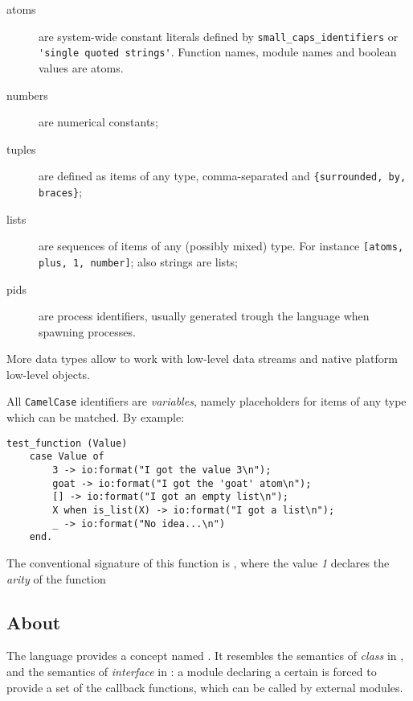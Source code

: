 \begin{description}

    \item[atoms] are system-wide constant literals defined by
        \lstinline{small_caps_identifiers} or
        \lstinline{'single quoted strings'}. Function names, module
        names and boolean values are atoms.

    \item[numbers] are numerical constants;

    \item[tuples] are defined as items of any type, comma-separated and
        \lstinline|{surrounded, by, braces}|;

    \item[lists] are sequences of items of any (possibly mixed) type.
        For instance
        \lstinline{[atoms, plus, 1, number]}; also strings are lists;

    \item[pids] are process identifiers, usually generated trough the
        language  when spawning processes.

\end{description}

More data types allow to work with low-level data streams and native
platform low-level objects.

All \lstinline{CamelCase} identifiers are \emph{variables}, namely
placeholders for items of any type which can be matched. By example:

\begin{lstlisting}
test_function (Value)
    case Value of
        3 -> io:format("I got the value 3\n");
        goat -> io:format("I got the 'goat' atom\n");
        [] -> io:format("I got an empty list\n");
        X when is_list(X) -> io:format("I got a list\n");
        _ -> io:format("No idea...\n")
    end.
\end{lstlisting}

The conventional signature of this function is ,
where the value \emph{1} declares the \emph{arity} of the function


\subsection{About \OTP}

The language provides a concept named . It resembles the
semantics of \emph{class} in , and the semantics of
\emph{interface} in : a module declaring a certain
 is forced to provide a set of the callback functions,
which can be called by external modules.

